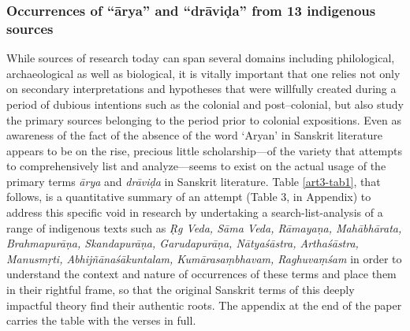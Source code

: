 \subsubsection{Occurrences of “ārya” and “drāviḍa” from 13 indigenous sources}

While sources of research today can span several domains including philological, archaeological as well as biological, it is vitally important that one relies not only on secondary interpretations and hypotheses that were willfully created during a period of dubious intentions such as the colonial and post–colonial, but also study the primary sources belonging to the period prior to colonial expositions. Even as awareness of the fact of the absence of the word ‘Aryan’ in Sanskrit literature appears to be on the rise, precious little scholarship—of the variety that attempts to comprehensively list and analyze—seems to exist on the actual usage of the primary terms \textit{ārya} and \textit{drāviḍa} in Sanskrit literature. Table \ref{art3-tab1}, that follows, is a quantitative summary of an attempt (Table 3, in Appendix) to address this specific void in research by undertaking a search-list-analysis of a range of indigenous texts such as \textit{Ṛg Veda, Sāma Veda, Rāmayaṇa, Mahābhārata, Brahmapurāṇa, Skandapurāṇa, Garudapurāṇa, Nātyaśāstra, Arthaśāstra, Manusmṛti, Abhijñānaśākuntalam, Kumārasaṃbhavam, Raghuvaṃśam} in order to understand the context and nature of occurrences of these terms and place them in their rightful frame, so that the original Sanskrit terms of this deeply impactful theory find their authentic roots. The appendix at the end of the paper carries the table with the verses in full.

\newpage

